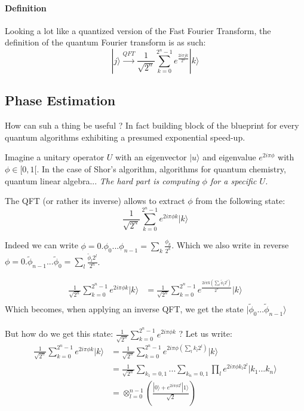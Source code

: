 \documentclass{article}
\begin{document}
\paragraph{Definition} Looking a lot like a quantized version of the Fast Fourier Transform, the definition of the quantum Fourier
transform is as such:
$$ |j\rangle \xrightarrow[]{QFT} \frac{1}{\sqrt{2^n}} \sum_{k=0}^{2^n-1} e^{\frac{2i\pi jk}{2^n}} |k\rangle $$

\subsection{Phase Estimation}

How can suh a thing be useful ? In fact building block of the blueprint for every 
quantum algorithms exhibiting a presumed exponential speed-up.

Imagine a unitary operator $U$ with an eigenvector $|u\rangle$ and
eigenvalue $e^{2i\pi \phi}$ with $\phi\in[0,1[$. In the case of Shor's algorithm,
algorithms for quantum chemistry, quantum linear algebra... \emph{The hard part is 
computing $\phi$ for a specific $U$.}

The QFT (or rather its inverse) allows to extract $\phi$ from the following state:
$$\frac{1}{\sqrt{2^n}}\sum_{k=0}^{2^n-1} e^{2i\pi\phi k}  |k\rangle$$

Indeed we can write $\phi=0.\phi_0...\phi_{n-1}=\sum_{k}\frac{\phi_k}{2^k}$.
Which we also write in reverse $\phi=0.\tilde{\phi}_{n-1}...\tilde{\phi}_0=
\sum_{l}\frac{\tilde{\phi}_l 2^l}{2^n}$.

\begin{align*}
  \frac{1}{\sqrt{2^n}}  \sum_{k=0}^{2^n-1} e^{2i\pi\phi k}  |k\rangle &= \frac{1}{\sqrt{2^n}}\sum_{k=0}^{2^n-1} e^{\frac{2i\pi k \left(\sum_l{\tilde{\phi}_l 2^l}\right)}{2^n} }  |k\rangle \\ 
\end{align*}
Which becomes, when applying an inverse QFT, we get the state $|\tilde{\phi}_0...\tilde{\phi}_{n-1}\rangle$

\paragraph{} But how do we get this state: $\frac{1}{\sqrt{2^n}}\sum_{k=0}^{2^n-1} e^{2i\pi\phi k} $ ? 
Let us write:
\begin{align*}
 \frac{1}{\sqrt{2^n}}   \sum_{k=0}^{2^n-1} e^{2i\pi\phi k} |k\rangle &= \frac{1}{\sqrt{2^n}} \sum_{k=0}^{2^n-1} e^{2i\pi\phi \left(\sum_{l} k_l 2^l\right)} |k\rangle \\
    &= \frac{1}{\sqrt{2^n}}\sum_{k_1=0,1}...\sum_{k_n=0,1} \prod_{l} e^{2i\pi\phi k_l 2^l} |k_1...k_n\rangle \\
    &= \otimes_{l=0}^{n-1} \left(\frac{|0\rangle+e^{2i\pi\phi 2^l}|1\rangle}{\sqrt{2}}\right)
\end{align*}
\end{document}
